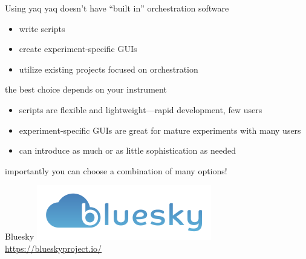 \documentclass{presentation}
\begin{document}
\begin{frame}{Using yaq}
  yaq doesn't have ``built in'' orchestration software
  \begin{itemize}
    \item write scripts
    \item create experiment-specific GUIs
    \item utilize existing projects focused on orchestration
  \end{itemize}
  \vfill
  the best choice depends on your instrument
  \begin{itemize}
    \item scripts are flexible and lightweight---rapid development, few users
    \item experiment-specific GUIs are great for mature experiments with many users
    \item can introduce as much or as little sophistication as needed
  \end{itemize}
  importantly you can choose a combination of many options!
\end{frame}

\begin{frame}{Bluesky}
  \center
  \includegraphics[width=\textwidth]{./bluesky-logo.png}
  \url{https://blueskyproject.io/}
\end{frame}
\end{document}
